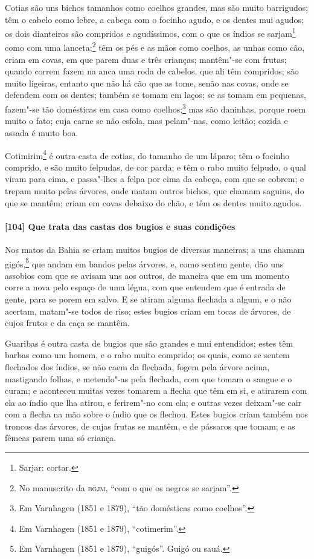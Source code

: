 \begin{linenumbers}
Cotias são uns bichos tamanhos como coelhos grandes, mas são muito barrigudos; têm o
cabelo como lebre, a cabeça com o focinho agudo, e os dentes mui agudos; os dois
dianteiros são compridos e agudíssimos, com o que os índios se sarjam\footnote{ Sarjar:
cortar.} como com uma lanceta;\footnote{ No manuscrito da \textsc{bgjm}, ``com o que os
negros se sarjam''.} têm os pés e as mãos como coelhos, as unhas como cão, criam em covas,
em que parem duas e três crianças; mantêm"-se com frutas; quando correm fazem na anca uma
roda de cabelos, que ali têm compridos; são muito ligeiras, entanto que não há cão que as
tome, senão nas covas, onde se defendem com os dentes; também se tomam em laços; se as
tomam em pequenas, fazem"-se tão domésticas em casa como coelhos;\footnote{ Em Varnhagen
(1851 e 1879), ``tão domésticas como coelhos''.} mas são daninhas, porque roem muito o
fato; cuja carne se não esfola, mas pelam"-nas, como leitão; cozida e assada é muito boa.

Cotimirim\footnote{ Em Varnhagen (1851 e 1879), ``cotimerim''.} é outra casta de cotias,
do tamanho de um láparo; têm o focinho comprido, e são muito felpudas, de cor parda; e têm
o rabo muito felpudo, o qual viram para cima, e passa"-lhes a felpa por cima da cabeça, com
que se cobrem; e trepam muito pelas árvores, onde matam outros bichos, que chamam saguins,
do que se mantêm; criam em covas debaixo do chão, e têm os dentes muito agudos.

\paragraph{[104] Que trata das castas dos bugios e suas condições}\quad
Nos matos da Bahia se criam muitos bugios de diversas maneiras; a uns chamam
gigós,\footnote{ Em Varnhagen (1851 e 1879), ``guigós''. Guigó ou sauá.} que andam em
bandos pelas árvores, e, como sentem gente, dão uns assobios com que se avisam uns aos
outros, de maneira que em um momento corre a nova pelo espaço de uma légua, com que
entendem que é entrada de gente, para se porem em salvo. E se atiram alguma flechada a
algum, e o não acertam, matam"-se todos de riso; estes bugios criam em tocas de árvores, de
cujos frutos e da caça se mantêm.

Guaribas é outra casta de bugios que são grandes e mui entendidos; estes têm barbas como
um homem, e o rabo muito comprido; os quais, como se sentem flechados dos índios, se não
caem da flechada, fogem pela árvore acima, mastigando folhas, e metendo"-as pela flechada,
com que tomam o sangue e o curam; e aconteceu muitas vezes tomarem a flecha que têm em si,
e atirarem com ela ao índio que lha atirou, e ferirem"-no com ela; e outras vezes deixam"-se
cair com a flecha na mão sobre o índio que os flechou. Estes bugios criam também nos
troncos das árvores, de cujas frutas se mantêm, e de pássaros que tomam; e as fêmeas parem
uma só criança.


\end{linenumbers}
